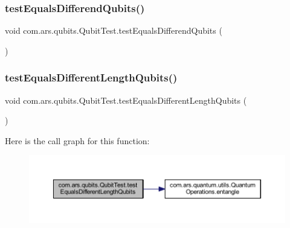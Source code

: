 \subsubsection{\texorpdfstring{test\+Equals\+Differend\+Qubits()}{testEqualsDifferendQubits()}}
{\footnotesize\ttfamily void com.\+ars.\+qubits.\+Qubit\+Test.\+test\+Equals\+Differend\+Qubits (\begin{DoxyParamCaption}{ }\end{DoxyParamCaption})}

\hypertarget{classcom_1_1ars_1_1qubits_1_1_qubit_test_a709c83a9267630746e57b0903ad53c41}{}\label{classcom_1_1ars_1_1qubits_1_1_qubit_test_a709c83a9267630746e57b0903ad53c41} 
\subsubsection{\texorpdfstring{test\+Equals\+Different\+Length\+Qubits()}{testEqualsDifferentLengthQubits()}}
{\footnotesize\ttfamily void com.\+ars.\+qubits.\+Qubit\+Test.\+test\+Equals\+Different\+Length\+Qubits (\begin{DoxyParamCaption}{ }\end{DoxyParamCaption})}

Here is the call graph for this function\+:\nopagebreak
\begin{figure}[H]
\begin{center}
\leavevmode
\includegraphics[width=350pt]{classcom_1_1ars_1_1qubits_1_1_qubit_test_a709c83a9267630746e57b0903ad53c41_cgraph}
\end{center}
\end{figure}
\hypertarget{classcom_1_1ars_1_1qubits_1_1_qubit_test_a399fda391bd4201af1d625d3beb8e1fd}{}\label{classcom_1_1ars_1_1qubits_1_1_qubit_test_a399fda391bd4201af1d625d3beb8e1fd} 
